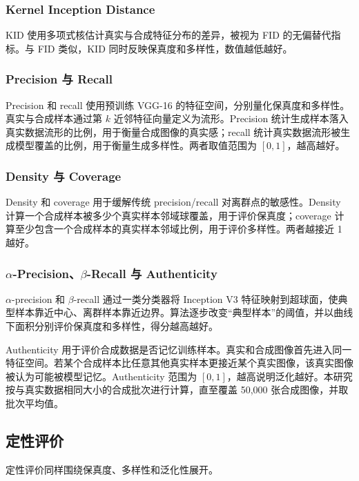 \documentclass[UTF8,11pt,a4paper]{ctexart}
\begin{document}
\subsubsection{Kernel Inception Distance}

KID 使用多项式核估计真实与合成特征分布的差异，被视为 FID 的无偏替代指标。与 FID 类似，KID 同时反映保真度和多样性，数值越低越好。

\subsubsection{Precision 与 Recall}

Precision 和 recall 使用预训练 VGG-16 的特征空间，分别量化保真度和多样性。真实与合成样本通过第 $k$ 近邻特征向量定义为流形。Precision 统计生成样本落入真实数据流形的比例，用于衡量合成图像的真实感；recall 统计真实数据流形被生成模型覆盖的比例，用于衡量生成多样性。两者取值范围为 $[0,1]$，越高越好。

\subsubsection{Density 与 Coverage}

Density 和 coverage 用于缓解传统 precision/recall 对离群点的敏感性。Density 计算一个合成样本被多少个真实样本邻域球覆盖，用于评价保真度；coverage 计算至少包含一个合成样本的真实样本邻域比例，用于评价多样性。两者越接近 1 越好。

\subsubsection{$\alpha$-Precision、$\beta$-Recall 与 Authenticity}

$\alpha$-precision 和 $\beta$-recall 通过一类分类器将 Inception V3 特征映射到超球面，使典型样本靠近中心、离群样本靠近边界。算法逐步改变“典型样本”的阈值，并以曲线下面积分别评价保真度和多样性，得分越高越好。

Authenticity 用于评价合成数据是否记忆训练样本。真实和合成图像首先进入同一特征空间。若某个合成样本比任意其他真实样本更接近某个真实图像，该真实图像被认为可能被模型记忆。Authenticity 范围为 $[0,1]$，越高说明泛化越好。本研究按与真实数据相同大小的合成批次进行计算，直至覆盖 50,000 张合成图像，并取批次平均值。

\subsection{定性评价}

定性评价同样围绕保真度、多样性和泛化性展开。
\end{document}
